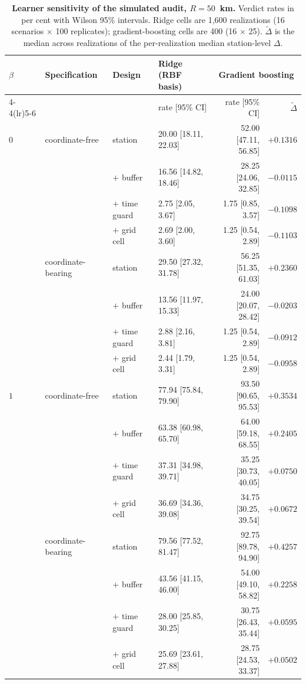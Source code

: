\documentclass[11pt]{article}
\begin{document}
\begin{table}[htbp]\centering\footnotesize
\caption{\textbf{Learner sensitivity of the simulated audit, $R=50$~km.} Verdict rates in per cent with Wilson 95\% intervals. Ridge cells are 1{,}600 realizations (16 scenarios $\times$ 100 replicates); gradient-boosting cells are 400 (16 $\times$ 25). $\tilde\Delta$ is the median across realizations of the per-realization median station-level $\Delta$.}
\label{tab:learner}
\begin{tabular}{llllrr}\toprule
$\beta$ & Specification & Design & Ridge (RBF basis) & \multicolumn{2}{c}{Gradient boosting} \\
\cmidrule(lr){4-4}\cmidrule(lr){5-6}
 & & & rate [95\% CI] & rate [95\% CI] & $\tilde\Delta$ \\ \midrule
$0$ & coordinate-free & station & 20.00 [18.11, 22.03] & 52.00 [47.11, 56.85] & $+0.1316$ \\
 &  & $+$ buffer & 16.56 [14.82, 18.46] & 28.25 [24.06, 32.85] & $-0.0115$ \\
 &  & $+$ time guard & 2.75 [2.05, 3.67] & 1.75 [0.85, 3.57] & $-0.1098$ \\
 &  & $+$ grid cell & 2.69 [2.00, 3.60] & 1.25 [0.54, 2.89] & $-0.1103$ \\
\addlinespace
 & coordinate-bearing & station & 29.50 [27.32, 31.78] & 56.25 [51.35, 61.03] & $+0.2360$ \\
 &  & $+$ buffer & 13.56 [11.97, 15.33] & 24.00 [20.07, 28.42] & $-0.0203$ \\
 &  & $+$ time guard & 2.88 [2.16, 3.81] & 1.25 [0.54, 2.89] & $-0.0912$ \\
 &  & $+$ grid cell & 2.44 [1.79, 3.31] & 1.25 [0.54, 2.89] & $-0.0958$ \\
\addlinespace
$1$ & coordinate-free & station & 77.94 [75.84, 79.90] & 93.50 [90.65, 95.53] & $+0.3534$ \\
 &  & $+$ buffer & 63.38 [60.98, 65.70] & 64.00 [59.18, 68.55] & $+0.2405$ \\
 &  & $+$ time guard & 37.31 [34.98, 39.71] & 35.25 [30.73, 40.05] & $+0.0750$ \\
 &  & $+$ grid cell & 36.69 [34.36, 39.08] & 34.75 [30.25, 39.54] & $+0.0672$ \\
\addlinespace
 & coordinate-bearing & station & 79.56 [77.52, 81.47] & 92.75 [89.78, 94.90] & $+0.4257$ \\
 &  & $+$ buffer & 43.56 [41.15, 46.00] & 54.00 [49.10, 58.82] & $+0.2258$ \\
 &  & $+$ time guard & 28.00 [25.85, 30.25] & 30.75 [26.43, 35.44] & $+0.0595$ \\
 &  & $+$ grid cell & 25.69 [23.61, 27.88] & 28.75 [24.53, 33.37] & $+0.0502$ \\
\bottomrule\end{tabular}\end{table}
\end{document}
